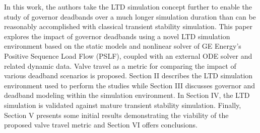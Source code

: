 


In this work, the authors take the LTD simulation concept further to enable the study of governor deadbands over a much longer simulation duration than can be reasonably accomplished with classical transient stability simulation. 
This paper explores the impact of governor deadbands using a novel LTD simulation environment based on the static models and nonlinear solver of GE Energy's Positive Sequence Load Flow (PSLF)\cite{PSLFUserManual}, coupled with an external ODE solver and related dynamic data. 
Valve travel as a metric for comparing the impact of various deadband scenarios is proposed. 
Section II describes the LTD simulation environment used to perform the studies while
Section III discusses governor and deadband modeling within the simulation environment. 
In Section IV, the LTD simulation is validated against mature transient stability simulation. 
Finally, Section V presents some initial results demonstrating the viability of the proposed valve travel metric and Section VI offers conclusions.